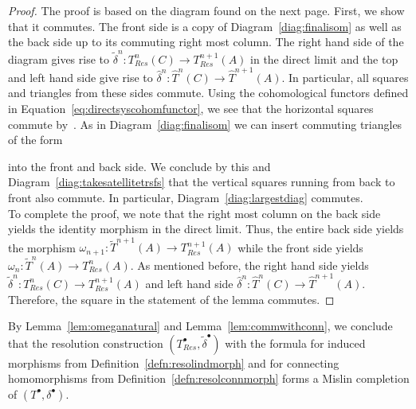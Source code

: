 \documentclass[12pt,a4paper]{article}
\numberwithin{equation}{section}
\theoremstyle{nonumberplain}
\newtheorem{proof}{Proof}
\begin{document}
\begin{proof}
The proof is based on the diagram found on the next page. First, we show that it commutes. The front side is a copy of Diagram~\ref{diag:finalisom} as well as the back side up to its commuting right most column. The right hand side of the diagram gives rise to $\widetilde{\delta}^n: T_{Res}^n(C) \rightarrow T_{Res}^{n+1}(A)$ in the direct limit and the top and left hand side give rise to $\widehat{\delta}^n: \widehat{T}^n(C) \rightarrow \widehat{T}^{n+1}(A)$. In particular, all squares and triangles from these sides commute. Using the cohomological functors defined in Equation~\ref{eq:directsyscohomfunctor}, we see that the horizontal squares commute by~\cite[Proposition~III.4.1]{car56}. As in Diagram~\ref{diag:finalisom} we can insert commuting triangles of the form
\begin{center}
\end{center}
into the front and back side. We conclude by this and Diagram~\ref{diag:takesatellitetrsfs} that the vertical squares running from back to front also commute. In particular, Diagram~\ref{diag:largestdiag} commutes. \\

To complete the proof, we note that the right most column on the back side yields the identity morphism in the direct limit. Thus, the entire back side yields the morphism $\omega_{n+1}: \widetilde{T}^{n+1}(A) \rightarrow T_{Res}^{n+1}(A)$ while the front side yields $\omega_n: \widetilde{T}^n(A) \rightarrow T_{Res}^n(A)$. As mentioned before, the right hand side yields $\widetilde{\delta}^n: T_{Res}^n(C) \rightarrow T_{Res}^{n+1}(A)$ and left hand side $\widehat{\delta}^n: \widehat{T}^n(C) \rightarrow \widehat{T}^{n+1}(A)$. Therefore, the square in the statement of the lemma commutes.
\end{proof}

By Lemma~\ref{lem:omeganatural} and Lemma~\ref{lem:commwithconn}, we conclude that the resolution construction $(T_{Res}^{\bullet}, \widetilde{\delta}^{\bullet})$ with the formula for induced morphisms from Definition~\ref{defn:resolindmorph} and for connecting homomorphisms from Definition~\ref{defn:resolconnmorph} forms a Mislin completion of $(T^{\bullet}, \delta^{\bullet})$.
\end{document}
